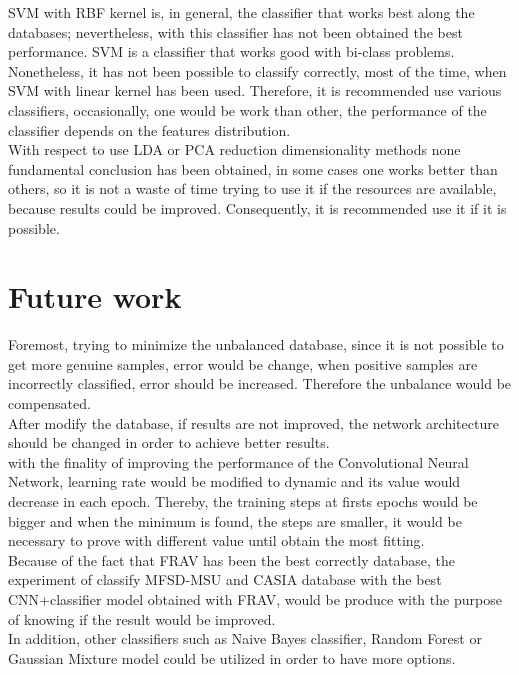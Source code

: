 SVM with RBF kernel is, in general, the classifier that works best along the databases; nevertheless, with this classifier has not been obtained the best performance. SVM is a classifier that works good with bi-class problems. Nonetheless, it has not been possible to classify correctly, most of the time, when SVM with linear kernel has been used. Therefore, it is recommended use various classifiers, occasionally, one would be work than other, the performance of the classifier depends on the features distribution.\\


With respect to use LDA or PCA reduction dimensionality methods none fundamental conclusion has been obtained, in some cases one works better than others, so it is not a waste of time trying to use it if the resources are available, because results could be improved. Consequently, it is recommended use it if it is possible.\\


\section{Future work}
Foremost, trying to minimize the unbalanced database, since it is not possible to get more genuine samples, error would be change, when positive samples are incorrectly classified, error should be increased. Therefore the unbalance would be compensated.\\

After modify the database, if results are not improved, the network architecture should be changed in order to achieve better results.\\

with the finality of improving the performance of the Convolutional Neural Network, learning rate would be modified to dynamic and its value would decrease in each epoch. Thereby, the training steps at firsts epochs would be bigger and when the minimum is found, the steps are smaller, it would be necessary to prove with different value until obtain the most fitting.\\

Because of the fact that FRAV has been the best correctly database, the experiment of classify MFSD-MSU and CASIA database with the best CNN+classifier model obtained with FRAV, would be produce with the purpose of knowing if the result would be improved.\\

In addition, other classifiers such as Naive Bayes classifier, Random Forest or Gaussian Mixture model could be utilized in order to have more options.\\
